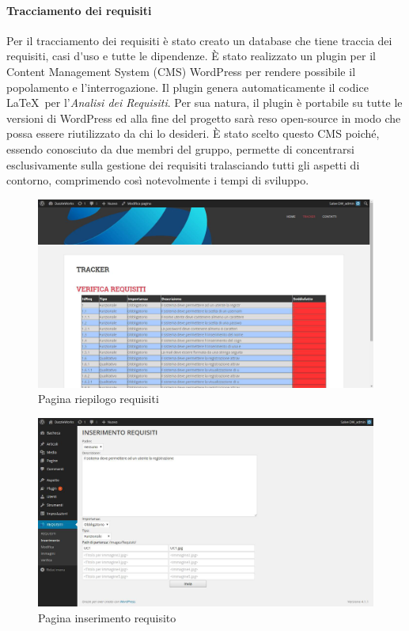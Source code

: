 \paragraph{Tracciamento dei requisiti}
Per il tracciamento dei requisiti è stato creato un \gls{database} che tiene traccia dei requisiti, \gls{casi d'uso} e tutte le dipendenze.
È stato realizzato un \gls{plugin} per il Content Management System (\gls{CMS}) \gls{WordPress} per rendere possibile il popolamento e l'interrogazione.
Il \gls{plugin} genera automaticamente il codice \LaTeX\ per l'\textit{Analisi dei Requisiti}.
Per sua natura, il \gls{plugin} è portabile su tutte le versioni di \gls{WordPress} ed alla fine del progetto sarà reso open-source in modo che possa essere riutilizzato da chi lo desideri. È stato scelto questo \gls{CMS} poiché, essendo conosciuto da due membri del gruppo, permette di concentrarsi esclusivamente sulla gestione dei requisiti tralasciando tutti gli aspetti di contorno, comprimendo così notevolmente i tempi di sviluppo.
\begin{figure}[h]
	\centering
	\includegraphics[width=0.7\linewidth]{img/tracker1}
	\caption[Pagina riepilogo requisiti]{Pagina riepilogo requisiti}
	\label{fig:tracker1}
\end{figure}
\begin{figure}[h]
	\centering
	\includegraphics[width=0.7\linewidth]{img/tracker2}
	\caption[Pagina inserimento requisito]{Pagina inserimento requisito}
	\label{fig:tracker2}
\end{figure}

